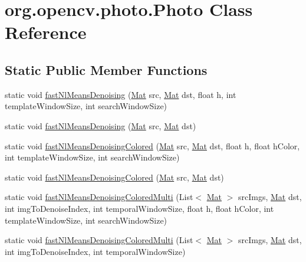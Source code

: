 \hypertarget{classorg_1_1opencv_1_1photo_1_1_photo}{}\section{org.\+opencv.\+photo.\+Photo Class Reference}
\label{classorg_1_1opencv_1_1photo_1_1_photo}
\subsection*{Static Public Member Functions}
\begin{DoxyCompactItemize}
\item 
static void \mbox{\hyperlink{classorg_1_1opencv_1_1photo_1_1_photo_acbb2502090325d4b0e7f6cf6c5f171a0}{fast\+Nl\+Means\+Denoising}} (\mbox{\hyperlink{classorg_1_1opencv_1_1core_1_1_mat}{Mat}} src, \mbox{\hyperlink{classorg_1_1opencv_1_1core_1_1_mat}{Mat}} dst, float h, int template\+Window\+Size, int search\+Window\+Size)
\item 
static void \mbox{\hyperlink{classorg_1_1opencv_1_1photo_1_1_photo_a8bc43360694475a2d59ce97f2d43d956}{fast\+Nl\+Means\+Denoising}} (\mbox{\hyperlink{classorg_1_1opencv_1_1core_1_1_mat}{Mat}} src, \mbox{\hyperlink{classorg_1_1opencv_1_1core_1_1_mat}{Mat}} dst)
\item 
static void \mbox{\hyperlink{classorg_1_1opencv_1_1photo_1_1_photo_a445e4b8c401bc65ddd5d71d0d2e656f9}{fast\+Nl\+Means\+Denoising\+Colored}} (\mbox{\hyperlink{classorg_1_1opencv_1_1core_1_1_mat}{Mat}} src, \mbox{\hyperlink{classorg_1_1opencv_1_1core_1_1_mat}{Mat}} dst, float h, float h\+Color, int template\+Window\+Size, int search\+Window\+Size)
\item 
static void \mbox{\hyperlink{classorg_1_1opencv_1_1photo_1_1_photo_aa38d4845c5dc44f35e948724ad83393f}{fast\+Nl\+Means\+Denoising\+Colored}} (\mbox{\hyperlink{classorg_1_1opencv_1_1core_1_1_mat}{Mat}} src, \mbox{\hyperlink{classorg_1_1opencv_1_1core_1_1_mat}{Mat}} dst)
\item 
static void \mbox{\hyperlink{classorg_1_1opencv_1_1photo_1_1_photo_a8880d07c3acf6bebf7ed92d4a453e4e2}{fast\+Nl\+Means\+Denoising\+Colored\+Multi}} (List$<$ \mbox{\hyperlink{classorg_1_1opencv_1_1core_1_1_mat}{Mat}} $>$ src\+Imgs, \mbox{\hyperlink{classorg_1_1opencv_1_1core_1_1_mat}{Mat}} dst, int img\+To\+Denoise\+Index, int temporal\+Window\+Size, float h, float h\+Color, int template\+Window\+Size, int search\+Window\+Size)
\item 
static void \mbox{\hyperlink{classorg_1_1opencv_1_1photo_1_1_photo_a532ea483d7d71b220309b47a8a255dcd}{fast\+Nl\+Means\+Denoising\+Colored\+Multi}} (List$<$ \mbox{\hyperlink{classorg_1_1opencv_1_1core_1_1_mat}{Mat}} $>$ src\+Imgs, \mbox{\hyperlink{classorg_1_1opencv_1_1core_1_1_mat}{Mat}} dst, int img\+To\+Denoise\+Index, int temporal\+Window\+Size)

\end{DoxyCompactItemize}
